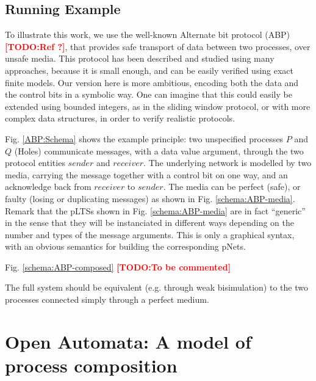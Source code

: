 \documentclass{lncs/llncs}
\newcommand{\TODO}[1]{\textcolor{red}{\textbf{[TODO:#1]}}}
\begin{document}
\subsection{Running Example}
To illustrate this work, we use the well-known Alternate bit protocol
(ABP) \TODO{Ref ?}, that provides safe transport of data between two processes,
over unsafe media. This protocol has been described and studied using
many approaches, because it is small enough, and can be easily
verified using exact finite models. Our version here is more
ambitious, encoding both the data and the control bits in a symbolic
way. One can imagine that this could easily be extended using bounded
integers, as in the sliding window protocol, or with more complex data
structures, in order to verify realistic protocols.

Fig. \ref{ABP:Schema} shows the example principle: two unspecified
processes $P$ and $Q$ (Holes) communicate messages, with a data value
argument, through the two protocol entities $sender$ and
$receiver$. The underlying network is modelled by two media,
carrying the message together with a control bit on one way, and an
acknowledge back from $receiver$ to $sender$. The media can be perfect (safe), or
faulty (losing or duplicating messages) as shown in
Fig. \ref{schema:ABP-media}. Remark that the pLTSs shown in
Fig. \ref{schema:ABP-media} are in fact ``generic'' in the sense that
they will be instanciated in different ways depending on the number
and types of the message arguments. This is only a graphical syntax,
with an obvious semantics for building the corresponding pNets.

Fig. \ref{schema:ABP-composed} \TODO{To be commented}

The full system should be equivalent (e.g. through weak bisimulation)
to the two processes connected simply through a perfect medium.

\section{Open Automata: A model of process composition}
\label{sec:OT}
\end{document}
